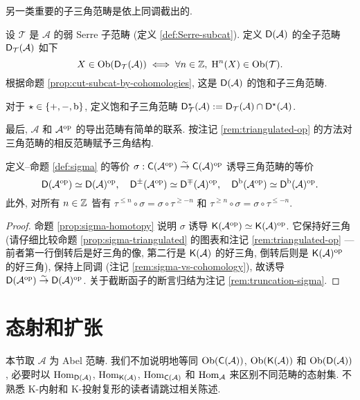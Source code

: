 另一类重要的子三角范畴是依上同调截出的.

\begin{definition}[上同调截出的三角子范畴]
	设 $\mathcal{T}$ 是 $\mathcal{A}$ 的弱 Serre 子范畴 (定义 \ref{def:Serre-subcat}). 定义 $\mathsf{D}(\mathcal{A})$ 的全子范畴 $\mathsf{D}_{\mathcal{T}}(\mathcal{A})$ 如下
	\[ X \in \operatorname{Ob}(\mathsf{D}_{\mathcal{T}}(\mathcal{A})) \iff \forall n \in \mathbb{Z}, \; \operatorname{H}^n(X) \in \operatorname{Ob}(\mathcal{T}). \]
	根据命题 \ref{prop:cut-subcat-by-cohomologies}, 这是 $\mathsf{D}(\mathcal{A})$ 的饱和子三角范畴.
	
	对于 $\star \in \{+, -, \mathrm{b}\}$, 定义饱和子三角范畴 $\mathsf{D}^\star_{\mathcal{T}}(\mathcal{A}) := \mathsf{D}_{\mathcal{T}}(\mathcal{A}) \cap \mathsf{D}^\star(\mathcal{A})$.
\end{definition}

最后, $\mathcal{A}$ 和 $\mathcal{A}^{\operatorname{op}}$ 的导出范畴有简单的联系. 按注记 \ref{rem:triangulated-op} 的方法对三角范畴的相反范畴赋予三角结构.

\begin{proposition}\label{prop:derived-cat-op}
	定义--命题 \ref{def:sigma} 的等价 $\sigma: \mathsf{C}(\mathcal{A}^{\operatorname{op}}) \stackrel{\sim}{\rightarrow} \mathsf{C}(\mathcal{A})^{\operatorname{op}}$ 诱导三角范畴的等价
	\[ \mathsf{D}(\mathcal{A}^{\operatorname{op}}) \simeq \mathsf{D}(\mathcal{A})^{\operatorname{op}}, \quad \mathsf{D}^\pm(\mathcal{A}^{\operatorname{op}}) \simeq \mathsf{D}^\mp(\mathcal{A})^{\operatorname{op}}, \quad \mathsf{D}^{\mathrm{b}}(\mathcal{A}^{\operatorname{op}}) \simeq \mathsf{D}^{\mathrm{b}}(\mathcal{A})^{\operatorname{op}}. \]
	此外, 对所有 $n \in \mathbb{Z}$ 皆有 $\tau^{\leq n} \circ \sigma = \sigma \circ \tau^{\geq -n}$ 和 $\tau^{\geq n} \circ \sigma = \sigma \circ \tau^{\leq -n}$.
\end{proposition}
\begin{proof}
	命题 \ref{prop:sigma-homotopy} 说明 $\sigma$ 诱导 $\mathsf{K}(\mathcal{A}^{\operatorname{op}}) \simeq \mathsf{K}(\mathcal{A})^{\operatorname{op}}$. 它保持好三角 (请仔细比较命题 \ref{prop:sigma-triangulated} 的图表和注记 \ref{rem:triangulated-op} --- 前者第一行倒转后是好三角的像, 第二行是 $\mathsf{K}(\mathcal{A})$ 的好三角, 倒转后则是 $\mathsf{K}(\mathcal{A})^{\operatorname{op}}$ 的好三角), 保持上同调 (注记 \ref{rem:sigma-vs-cohomology}), 故诱导 $\mathsf{D}(\mathcal{A}^{\operatorname{op}}) \stackrel{\sim}{\rightarrow} \mathsf{D}(\mathcal{A})^{\operatorname{op}}$. 关于截断函子的断言归结为注记 \ref{rem:truncation-sigma}.
\end{proof}

\section{态射和扩张}\label{sec:Hom-Ext}
本节取 $\mathcal{A}$ 为 Abel 范畴. 我们不加说明地等同 $\operatorname{Ob}(\mathsf{C}(\mathcal{A}))$, $\operatorname{Ob}(\mathsf{K}(\mathcal{A}))$ 和 $\operatorname{Ob}(\mathsf{D}(\mathcal{A}))$, 必要时以 $\operatorname{Hom}_{\mathsf{D}(\mathcal{A})}$, $\operatorname{Hom}_{\mathsf{K}(\mathcal{A})}$, $\operatorname{Hom}_{\mathsf{C}(\mathcal{A})}$ 和 $\operatorname{Hom}_{\mathcal{A}}$ 来区别不同范畴的态射集. 不熟悉 K-内射和 K-投射复形的读者请跳过相关陈述.


